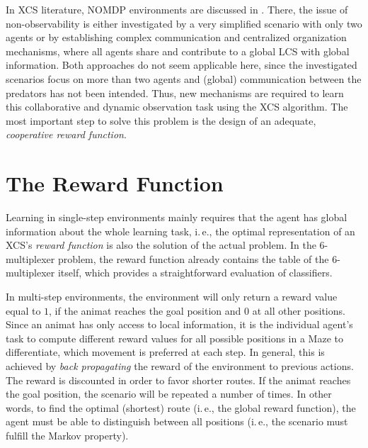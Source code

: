 \documentclass{sig-alternate}
\begin{document}
In XCS literature, NOMDP environments are discussed in \cite{Miyazaki2,TTS01}. There, the issue of non-observability is either investigated by a very simplified scenario with only two agents or by establishing complex communication and centralized organization mechanisms, where all agents share and contribute to a global LCS with global information. Both approaches do not seem applicable here, since the investigated scenarios focus on more than two agents and (global) communication between the predators has not been intended. Thus, new mechanisms are required to learn this %
collaborative and dynamic observation task using the XCS algorithm. The most important step to solve this problem is the design of an adequate, \emph{cooperative reward function}.%

%

\section{The Reward Function}
\label{section:the-reward-function}

Learning in single-step environments mainly requires that the agent has global information about the whole learning task, i.\,e., the optimal representation of an XCS's \emph{reward function} is also the solution of the actual problem. In the 6-multiplexer problem, the reward function already contains the table of the 6-multiplexer itself, which provides a straightforward evaluation of classifiers.

In multi-step environments, the environment will only return a reward value equal to $1$, if the animat reaches the goal position and $0$ %
at all other positions. Since an animat has only access to local information, it is the individual agent's task to compute different reward values for all possible positions in a Maze to differentiate, which movement is preferred at each step. In general, this is achieved by \emph{back propagating} the reward of the environment to previous actions. The reward is discounted in order to favor shorter routes. If the animat reaches the goal position, the scenario will be repeated a number of times. In other words, to find the optimal (shortest) route (i.\,e., the global reward function), the agent must be able to distinguish between all positions (i.\,e., the scenario must fulfill the Markov property).
\end{document}
